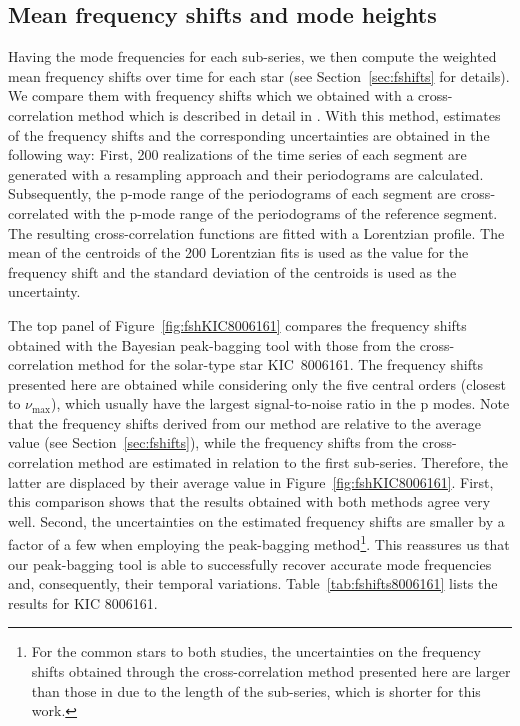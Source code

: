 \documentclass[twocolumn]{aastex61}%
\begin{document}
\subsection{Mean frequency shifts and mode heights}

Having the mode frequencies for each sub-series, we then compute the weighted mean frequency shifts over time for each star (see Section~\ref{sec:fshifts} for details). We compare them with frequency shifts which we obtained with a cross-correlation method which is described in detail in \citet{Kiefer2017}. With this method, estimates of the frequency shifts and the corresponding uncertainties are obtained in the following way: First, 200 realizations of the time series of each segment are generated with a resampling approach and their periodograms are calculated. Subsequently, the p-mode range of the periodograms of each segment are cross-correlated with the p-mode range of the periodograms of the reference segment. The resulting cross-correlation functions are fitted with a Lorentzian profile. The mean of the centroids of the 200 Lorentzian fits is used as the value for the frequency shift and the standard deviation of the centroids is used as the uncertainty.

The top panel of Figure~\ref{fig:fshKIC8006161} compares the frequency shifts obtained with the Bayesian peak-bagging tool with those from the cross-correlation method for the solar-type star KIC~8006161. The frequency shifts presented here are obtained while considering only the five central orders (closest to $\nu_\text{max}$), which usually have the largest signal-to-noise ratio in the p modes.
Note that the frequency shifts derived from our method are relative to the average value (see Section~\ref{sec:fshifts}), while the frequency shifts from the cross-correlation method are estimated in relation to the first sub-series. Therefore, the latter are displaced by their average value in Figure~\ref{fig:fshKIC8006161}. 
First, this comparison shows that the results obtained with both methods agree very well. Second, the uncertainties on the estimated frequency shifts are smaller by a factor of a few when employing the peak-bagging method\footnote{For the common stars to both studies, the uncertainties on the frequency shifts obtained through the cross-correlation method presented here are larger than those in \citet[][]{Kiefer2017} due to the length of the sub-series, which is shorter for this work.\vspace{-0.3cm}}. This reassures us that our peak-bagging tool is able to successfully recover accurate mode frequencies and, consequently, their temporal variations. Table~\ref{tab:fshifts8006161} lists the results for KIC 8006161.
\end{document}
